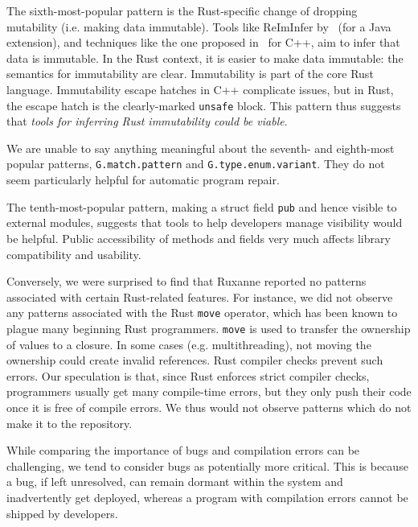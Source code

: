 The sixth-most-popular pattern is the Rust-specific change of dropping mutability (i.e. making data immutable). Tools like ReImInfer by~\cite{HuangMDE2012} (for a Java extension), and techniques like the one proposed in~\cite{EyolfsonAbstractImmutability} for C++, aim to infer that data is immutable. In the Rust context, it is easier to make data immutable: the semantics for immutability are clear. Immutability is part of the core Rust language. Immutability escape hatches in C++ complicate issues, but in Rust, the escape hatch is the clearly-marked \texttt{unsafe} block. This pattern thus suggests that \emph{tools for inferring Rust immutability could be viable}.

We are unable to say anything meaningful about the seventh- and eighth-most popular patterns, \texttt{G.match.pattern} and \texttt{G.type.enum.variant}. They do not seem particularly helpful for automatic program repair.

The tenth-most-popular pattern, making a struct field \texttt{pub} and hence visible to external modules, suggests that tools to help developers manage visibility would be helpful. Public accessibility of methods and fields very much affects library compatibility and usability.

Conversely, we were surprised to find that Ruxanne reported no patterns associated with certain Rust-related features. For instance, we did not observe any patterns associated with the Rust \verb+move+ operator, which has been known to plague many beginning Rust programmers. \verb+move+ is used to transfer the ownership of values to a closure. In some cases (e.g. multithreading), not moving the ownership could create invalid references. Rust compiler checks prevent such errors. Our speculation is that, since Rust enforces strict compiler checks, programmers usually get many compile-time errors, but they only push their code once it is free of compile errors. We thus would not observe patterns which do not make it to the repository.

While comparing the importance of bugs and compilation errors can be challenging, we tend to consider bugs as potentially more critical. This is because a bug, if left unresolved, can remain dormant within the system and inadvertently get deployed, whereas a program with compilation errors cannot be shipped by developers.

\vspace*{1em}

